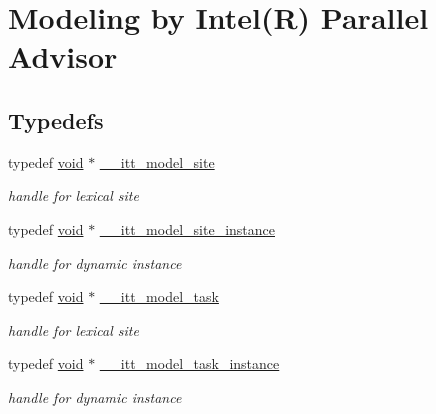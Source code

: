 \hypertarget{group__model}{\section{Modeling by Intel(R) Parallel Advisor}
\label{group__model}
}
\subsection*{Typedefs}
\begin{DoxyCompactItemize}
\item 
typedef \hyperlink{ittnotify__static_8h_af941d56e55e3c5465135b60c4d6343ed}{void} $\ast$ \hyperlink{group__model_ga920087b18ed59a70239461b5295cc26e}{\-\_\-\-\_\-itt\-\_\-model\-\_\-site}
\begin{DoxyCompactList}\small\item\em handle for lexical site \end{DoxyCompactList}\item 
typedef \hyperlink{ittnotify__static_8h_af941d56e55e3c5465135b60c4d6343ed}{void} $\ast$ \hyperlink{group__model_gaa037f000a165fb7fc2c73b97b31491f1}{\-\_\-\-\_\-itt\-\_\-model\-\_\-site\-\_\-instance}
\begin{DoxyCompactList}\small\item\em handle for dynamic instance \end{DoxyCompactList}\item 
typedef \hyperlink{ittnotify__static_8h_af941d56e55e3c5465135b60c4d6343ed}{void} $\ast$ \hyperlink{group__model_ga96b1dc87978dfc08d2f7740f9d3d2196}{\-\_\-\-\_\-itt\-\_\-model\-\_\-task}
\begin{DoxyCompactList}\small\item\em handle for lexical site \end{DoxyCompactList}\item 
typedef \hyperlink{ittnotify__static_8h_af941d56e55e3c5465135b60c4d6343ed}{void} $\ast$ \hyperlink{group__model_ga649e02ad732b5bfc895a239353d09588}{\-\_\-\-\_\-itt\-\_\-model\-\_\-task\-\_\-instance}
\begin{DoxyCompactList}\small\item\em handle for dynamic instance \end{DoxyCompactList}\end{DoxyCompactItemize}
